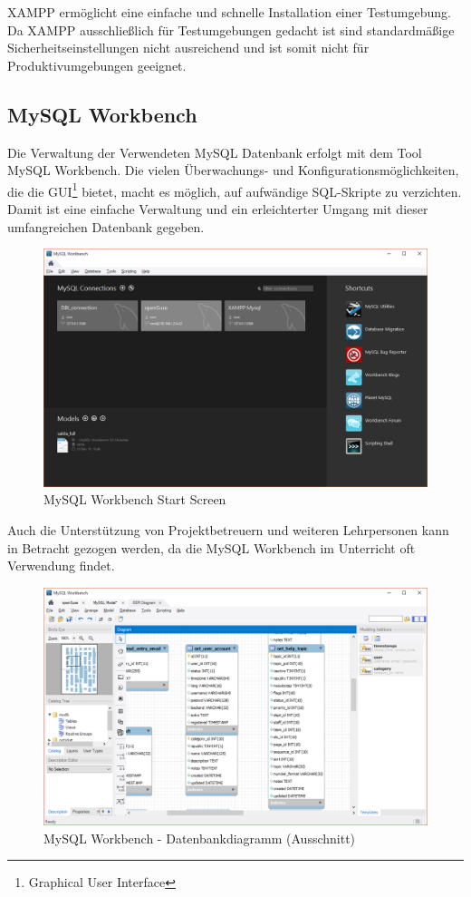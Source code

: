 	\newpage
	XAMPP ermöglicht eine einfache und schnelle Installation einer Testumgebung. Da XAMPP ausschließlich für Testumgebungen gedacht ist sind standardmäßige Sicherheitseinstellungen nicht ausreichend und ist somit nicht für Produktivumgebungen geeignet.
	
	
	\subsection{MySQL Workbench}
	Die Verwaltung der Verwendeten MySQL Datenbank erfolgt mit dem Tool MySQL Workbench. Die vielen Überwachungs- und Konfigurationsmöglichkeiten, die die GUI\footnote{Graphical User Interface} bietet, macht es möglich, auf aufwändige SQL-Skripte zu verzichten. Damit ist eine einfache Verwaltung und ein erleichterter Umgang mit dieser umfangreichen Datenbank gegeben.
	
	\begin{figure}[h]
		\centering
		\includegraphics[scale=.5]{figures/workbench_startgui.png}
		\caption{MySQL Workbench Start Screen}
		\label{Worbench_Startgui}
	\end{figure}

	Auch die Unterstützung von Projektbetreuern und weiteren Lehrpersonen kann in Betracht gezogen werden, da die MySQL Workbench im Unterricht oft Verwendung findet.
	
	

	\begin{figure}[h]
		\centering
		\includegraphics[scale=.5]{figures/workbench_reverse.png}
		\caption{MySQL Workbench - Datenbankdiagramm (Ausschnitt)}
		\label{Workbench_DiaGUI}
	\end{figure}
		
